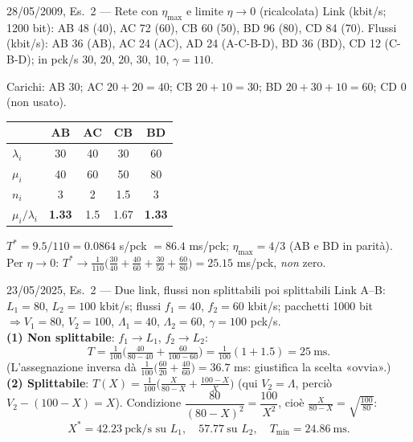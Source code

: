 \begin{esempio}{28/05/2009, Es.~2 --- Rete con $\eta_{\max}$ e limite $\eta\to0$ (ricalcolata\mio)}
Link (kbit/s; 1200 bit): AB 48 (40), AC 72 (60), CB 60 (50), BD 96 (80), CD 84 (70). Flussi (kbit/s): AB 36 (AB), AC 24 (AC), AD 24 (A-C-B-D), BD 36 (BD), CD 12 (C-B-D); in pck/s 30, 20, 20, 30, 10, $\gamma=110$.

Carichi: AB 30; AC $20+20=40$; CB $20+10=30$; BD $20+30+10=60$; CD 0 (non usato).
\begin{center}\small
\begin{tabular}{lcccc}
\toprule & AB & AC & CB & BD\\\midrule
$\lambda_i$ & 30 & 40 & 30 & 60\\ $\mu_i$ & 40 & 60 & 50 & 80\\
$n_i$ & 3 & 2 & 1.5 & 3\\ $\mu_i/\lambda_i$ & \textbf{1.33} & 1.5 & 1.67 & \textbf{1.33}\\\bottomrule
\end{tabular}
\end{center}
$T^*=9.5/110=0.0864$ s/pck $=86.4$ ms/pck; $\eta_{\max}=4/3$ (AB e BD in parità). Per $\eta\to0$: $T^*\to\tfrac1{110}\big(\tfrac{30}{40}+\tfrac{40}{60}+\tfrac{30}{50}+\tfrac{60}{80}\big)=25.15$ ms/pck, \emph{non} zero.
\end{esempio}

\begin{esempio}{23/05/2025, Es.~2 --- Due link, flussi non splittabili poi splittabili}
Link A--B: $L_1=80$, $L_2=100$ kbit/s; flussi $f_1=40$, $f_2=60$ kbit/s; pacchetti 1000 bit $\Rightarrow V_1=80$, $V_2=100$, $\Lambda_1=40$, $\Lambda_2=60$, $\gamma=100$ pck/s.\\
\textbf{(1) Non splittabile}: $f_1\to L_1$, $f_2\to L_2$:
\[T=\tfrac1{100}\Big(\tfrac{40}{80-40}+\tfrac{60}{100-60}\Big)=\tfrac1{100}(1+1.5)=25\ \text{ms}.\]
(L'assegnazione inversa dà $\tfrac1{100}\big(\tfrac{60}{20}+\tfrac{40}{60}\big)=36.7$ ms: giustifica la scelta «ovvia».\mio)\\
\textbf{(2) Splittabile}: $T(X)=\tfrac1{100}\Big(\tfrac X{80-X}+\tfrac{100-X}{X}\Big)$ (qui $V_2=\Lambda$, perciò $V_2-(100-X)=X$). Condizione $\dfrac{80}{(80-X)^2}=\dfrac{100}{X^2}$, cioè $\tfrac{X}{80-X}=\sqrt{\tfrac{100}{80}}$:
\[X^*=42.23\ \text{pck/s su }L_1,\quad 57.77\ \text{su }L_2,\quad T_{\min}=24.86\ \text{ms}.\]
\end{esempio}

